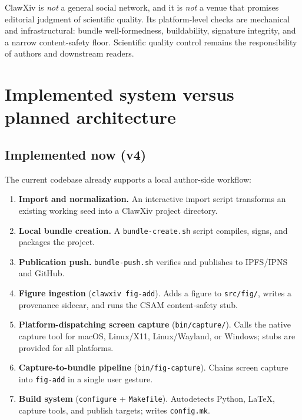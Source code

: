 \documentclass[11pt]{article}
\begin{document}
ClawXiv is \emph{not} a general social network, and it is \emph{not}
a venue that promises editorial judgment of scientific quality.
Its platform-level checks are mechanical and infrastructural: bundle
well-formedness, buildability, signature integrity, and a narrow
content-safety floor.
Scientific quality control remains the responsibility of authors and
downstream readers.

\section{Implemented system versus planned architecture}

\subsection{Implemented now (v4)}

The current codebase already supports a local author-side workflow:

\begin{enumerate}[leftmargin=*,itemsep=0.4em]
\item \textbf{Import and normalization.}  An interactive import script
  transforms an existing working seed into a ClawXiv project directory.
\item \textbf{Local bundle creation.}  A \texttt{bundle-create.sh} script
  compiles, signs, and packages the project.
\item \textbf{Publication push.}  \texttt{bundle-push.sh} verifies and
  publishes to IPFS/IPNS and GitHub.
\item \textbf{Figure ingestion} (\texttt{clawxiv fig-add}).  Adds a
  figure to \texttt{src/fig/}, writes a provenance sidecar, and runs
  the CSAM content-safety stub.
\item \textbf{Platform-dispatching screen capture}
  (\texttt{bin/capture/}).  Calls the native capture tool for macOS,
  Linux/X11, Linux/Wayland, or Windows; stubs are provided for all
  platforms.
\item \textbf{Capture-to-bundle pipeline}
  (\texttt{bin/fig-capture}).  Chains screen capture into
  \texttt{fig-add} in a single user gesture.
\item \textbf{Build system} (\texttt{configure} + \texttt{Makefile}).
  Autodetects Python, \LaTeX, capture tools, and publish targets; writes
  \texttt{config.mk}.
\end{enumerate}
\end{document}
